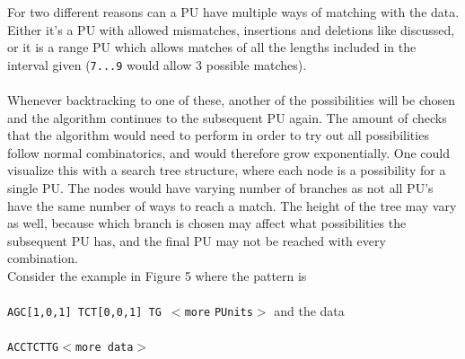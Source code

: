 \documentclass[12pt]{article}
\newcommand{\pu}{PU }
\newcommand{\pus}{PU's }
\newcommand{\pup}{PU. }
\begin{document}
\noindent For two different reasons can a \pu have multiple ways of matching with the data. Either it's a \pu with allowed mismatches,
insertions and deletions like discussed, or it is a range \pu which allows matches of all the lengths
included in the interval given (\texttt{7...9} would allow 3 possible matches). \\ \\
Whenever backtracking to one of these, another of the possibilities will be chosen and the algorithm continues to the
subsequent \pu again. The amount of checks that the algorithm would need to perform in order to try out
all possibilities follow normal combinatorics, and would therefore grow exponentially. One could visualize this
with a search tree structure, where each node is a possibility for a single \pup The nodes would
have varying number of branches as not all \pus have the same number of ways to reach a match. The height of the tree
may vary as well, because which branch is chosen may affect what possibilities the subsequent \pu has, and the final
\pu may not be reached with every combination. \\
Consider the example in Figure 5 where the pattern is \\ \\
\texttt{AGC[1,0,1]\; TCT[0,0,1]\; TG $<$more} \texttt{PUnits}$>$ and the data \\ \\
\texttt{ACCTCTTG$<$more data$>$}
\end{document}
